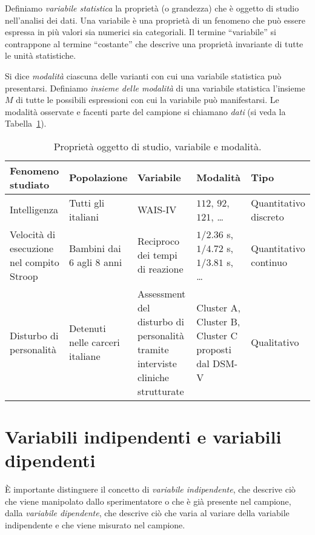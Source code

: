 Definiamo \emph{variabile statistica} la proprietà (o grandezza) che è oggetto di studio nell'analisi dei dati. 
Una variabile è una proprietà di un fenomeno che può essere espressa in più valori sia numerici sia categoriali. 
Il termine \enquote{variabile} si contrappone al termine \enquote{costante} che descrive una proprietà invariante di tutte le unità statistiche.

Si dice \emph{modalità} ciascuna delle varianti con cui una variabile statistica può presentarsi.
Definiamo \emph{insieme delle modalità} di una variabile statistica l'insieme $M$ di tutte le possibili espressioni con cui la variabile può manifestarsi.
Le modalità osservate e facenti parte del campione si chiamano \emph{dati} (si veda la Tabella~\ref{tab:term_st_desc}). 


\begin{table}[h!]
\scriptsize
\begin{tabular}{p{2.0cm}|p{2.0cm}|p{2.0cm}|p{2.0cm}|p{2.0cm}}
\toprule
\textbf{Fenomeno studiato} & \textbf{Popolazione} & \textbf{Variabile} & \textbf{Modalità} & \textbf{Tipo}\\
\midrule
  Intelligenza & Tutti gli italiani & WAIS-IV & $112$, $92$, $121$, \dots & Quantitativo discreto \\
\midrule
Velocità di esecuzione nel compito Stroop & Bambini dai 6 agli 8 anni & Reciproco dei tempi di reazione & $1/2.36$ s, $1/4.72$ s, $1/3.81$ s, \dots & Quantitativo continuo\\
\midrule
Disturbo di personalità & Detenuti nelle carceri italiane & Assessment del disturbo di personalità tramite interviste cliniche strutturate & Cluster A, Cluster B, Cluster C proposti dal DSM-V & Qualitativo\\
  \bottomrule
\end{tabular}
\caption{Proprietà oggetto di studio, variabile e modalità.}
\label{tab:term_st_desc}
\end{table}


\section{Variabili indipendenti e variabili dipendenti}

È importante distinguere il concetto di \emph{variabile indipendente}, che descrive ciò che viene manipolato dallo sperimentatore o che è già presente nel campione, dalla \emph{variabile dipendente}, che descrive ciò che varia al variare della variabile indipendente e che viene misurato nel campione.

